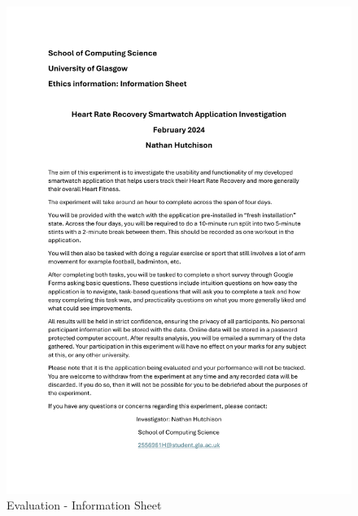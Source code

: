 \documentclass{l4proj}
\begin{document}
\begin{figure}[h!]
    \centering
    \includegraphics[width=1\linewidth]{dissertation//dissImages/InformationSheet.pdf}
    \caption{Evaluation - Information Sheet}
\end{figure}
\end{document}
